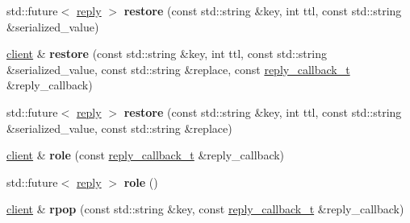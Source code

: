 \begin{DoxyCompactItemize}
\item 
\mbox{\label{classcpp__redis_1_1client_a5b7a7d7de93268198f27cd21f63ba337}} 
std\+::future$<$ \mbox{\hyperlink{classcpp__redis_1_1reply}{reply}} $>$ {\bfseries restore} (const std\+::string \&key, int ttl, const std\+::string \&serialized\+\_\+value)
\item 
\mbox{\label{classcpp__redis_1_1client_a5ebff3760403ee7d031083f185792780}} 
\mbox{\hyperlink{classcpp__redis_1_1client}{client}} \& {\bfseries restore} (const std\+::string \&key, int ttl, const std\+::string \&serialized\+\_\+value, const std\+::string \&replace, const \mbox{\hyperlink{classcpp__redis_1_1client_af7a65eb21aa25230bfbb0b0203c4fc04}{reply\+\_\+callback\+\_\+t}} \&reply\+\_\+callback)
\item 
\mbox{\label{classcpp__redis_1_1client_a15b2c81c1d5b86f3490ecfb154b29ad1}} 
std\+::future$<$ \mbox{\hyperlink{classcpp__redis_1_1reply}{reply}} $>$ {\bfseries restore} (const std\+::string \&key, int ttl, const std\+::string \&serialized\+\_\+value, const std\+::string \&replace)
\item 
\mbox{\label{classcpp__redis_1_1client_a73bc7e0a747d437e5f9ac233a152c9bc}} 
\mbox{\hyperlink{classcpp__redis_1_1client}{client}} \& {\bfseries role} (const \mbox{\hyperlink{classcpp__redis_1_1client_af7a65eb21aa25230bfbb0b0203c4fc04}{reply\+\_\+callback\+\_\+t}} \&reply\+\_\+callback)
\item 
\mbox{\label{classcpp__redis_1_1client_a34abe0819734b88704d89972b651e7ed}} 
std\+::future$<$ \mbox{\hyperlink{classcpp__redis_1_1reply}{reply}} $>$ {\bfseries role} ()
\item 
\mbox{\label{classcpp__redis_1_1client_aa29c7c00278934074e3cdbf70c0bb9cc}} 
\mbox{\hyperlink{classcpp__redis_1_1client}{client}} \& {\bfseries rpop} (const std\+::string \&key, const \mbox{\hyperlink{classcpp__redis_1_1client_af7a65eb21aa25230bfbb0b0203c4fc04}{reply\+\_\+callback\+\_\+t}} \&reply\+\_\+callback)
\item 
\mbox{\label{classcpp__redis_1_1client_a7a2ea6e56ce9fa430cfc44ada77d960b}} 

\end{DoxyCompactItemize}
